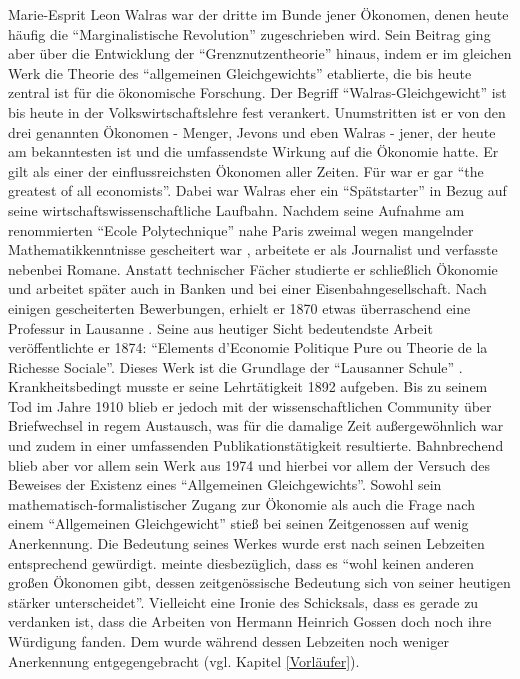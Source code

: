 Marie-Esprit Leon Walras war der dritte im Bunde jener Ökonomen, denen heute häufig die "`Marginalistische Revolution"' zugeschrieben wird. Sein Beitrag ging aber über die Entwicklung der "`Grenznutzentheorie"' hinaus, indem er im gleichen Werk die Theorie des "`allgemeinen Gleichgewichts"' etablierte, die bis heute zentral ist für die ökonomische Forschung. Der Begriff "`Walras-Gleichgewicht"' ist bis heute in der Volkswirtschaftslehre fest verankert. Unumstritten ist er von den drei genannten Ökonomen - Menger, Jevons und eben Walras - jener, der heute am bekanntesten ist und die umfassendste Wirkung auf die Ökonomie hatte. Er gilt als einer der einflussreichsten Ökonomen aller Zeiten. Für \textcite[S. 826]{Schumpeter1954} war er gar "`the greatest of all economists"'. Dabei war Walras eher ein "`Spätstarter"' in Bezug auf seine wirtschaftswissenschaftliche Laufbahn. Nachdem seine Aufnahme am renommierten "`Ecole Polytechnique"' nahe Paris zweimal wegen mangelnder Mathematikkenntnisse gescheitert war \parencite[S. 60]{Felderer1989}, arbeitete er als Journalist und verfasste nebenbei Romane. Anstatt technischer Fächer studierte er schließlich Ökonomie und arbeitet später auch in Banken und bei einer Eisenbahngesellschaft. Nach einigen gescheiterten Bewerbungen, erhielt er 1870 etwas überraschend \parencite[S. 63]{Streissler1990} eine Professur in Lausanne \parencite[S. 326]{Rosner2012}. Seine aus heutiger Sicht bedeutendste Arbeit veröffentlichte er 1874: "`Elements d'Economie Politique Pure ou Theorie de la Richesse Sociale"'. Dieses Werk ist die Grundlage der "`Lausanner Schule"' \parencite[S. 326]{Rosner2012}. Krankheitsbedingt musste er seine Lehrtätigkeit 1892 aufgeben. Bis zu seinem Tod im Jahre 1910 blieb er jedoch mit der wissenschaftlichen Community über Briefwechsel in regem Austausch, was für die damalige Zeit außergewöhnlich war und zudem in einer umfassenden Publikationstätigkeit resultierte. Bahnbrechend blieb aber vor allem sein Werk aus 1974 und hierbei vor allem der Versuch des Beweises der Existenz eines "`Allgemeinen Gleichgewichts"'. Sowohl sein mathematisch-formalistischer Zugang zur Ökonomie als auch die Frage nach einem "`Allgemeinen Gleichgewicht"' stieß bei seinen Zeitgenossen auf wenig Anerkennung. Die Bedeutung seines Werkes wurde erst nach seinen Lebzeiten entsprechend gewürdigt. \textcite[S. 75]{Felderer1989} meinte diesbezüglich, dass es "`wohl keinen anderen großen Ökonomen gibt, dessen zeitgenössische Bedeutung sich von seiner heutigen stärker unterscheidet"'. Vielleicht eine Ironie des Schicksals, dass es gerade \textcite{Walras1885} zu verdanken ist, dass die Arbeiten von Hermann Heinrich Gossen  doch noch ihre Würdigung fanden. Dem wurde während dessen Lebzeiten noch weniger Anerkennung entgegengebracht (vgl. Kapitel \ref{Vorläufer}).  


